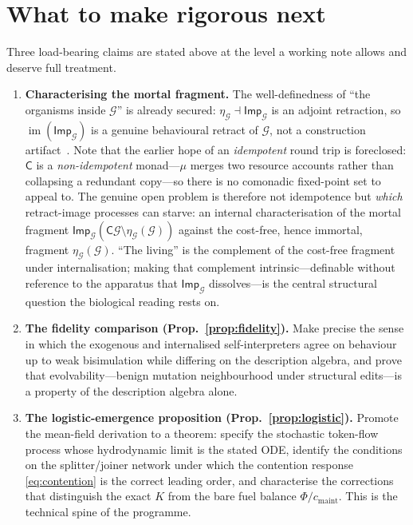 \documentclass[11pt]{article}
\theoremstyle{plain}
\theoremstyle{definition}
\theoremstyle{remark}
\newcommand{\G}{\mathcal{G}}
\newcommand{\C}{\mathsf{C}}
\newcommand{\cmaint}{c_{\mathrm{maint}}}
\newcommand{\Imp}{\mathsf{Imp}}
\newcommand{\unit}{\eta}
\newcommand{\mult}{\mu}
\begin{document}
\section{What to make rigorous next}
\label{sec:next}

Three load-bearing claims are stated above at the level a working note allows
and deserve full treatment.

\begin{enumerate}[leftmargin=1.6em,itemsep=0.35em]
\item \textbf{Characterising the mortal fragment.} The well-definedness of ``the
organisms inside $\G$'' is already secured: $\unit_\G\dashv\Imp_\G$ is an adjoint
retraction, so $\operatorname{im}(\Imp_\G)$ is a genuine behavioural retract of
$\G$, not a construction artifact~\cite{noteII}. Note that the earlier hope of
an \emph{idempotent} round trip is foreclosed: $\C$ is a \emph{non-idempotent}
monad---$\mult$ merges two resource accounts rather than collapsing a redundant
copy---so there is no comonadic fixed-point set to appeal to. The genuine open
problem is therefore not idempotence but \emph{which} retract-image processes can
starve: an internal characterisation of the mortal fragment
$\Imp_\G(\C\G\setminus\unit_\G(\G))$ against the cost-free, hence immortal,
fragment $\unit_\G(\G)$. ``The living'' is the complement of the cost-free
fragment under internalisation; making that complement intrinsic---definable
without reference to the apparatus that $\Imp_\G$ dissolves---is the central
structural question the biological reading rests on.

\item \textbf{The fidelity comparison (Prop.~\ref{prop:fidelity}).} Make precise
the sense in which the exogenous and internalised self-interpreters agree on
behaviour up to weak bisimulation while differing on the description algebra, and
prove that evolvability---benign mutation neighbourhood under structural
edits---is a property of the description algebra alone.

\item \textbf{The logistic-emergence proposition (Prop.~\ref{prop:logistic}).}
Promote the mean-field derivation to a theorem: specify the stochastic
token-flow process whose hydrodynamic limit is the stated ODE, identify the
conditions on the splitter/joiner network under which the contention response
\eqref{eq:contention} is the correct leading order, and characterise the
corrections that distinguish the exact $K$ from the bare fuel balance
$\Phi/\cmaint$. This is the technical spine of the programme.
\end{enumerate}
\end{document}
